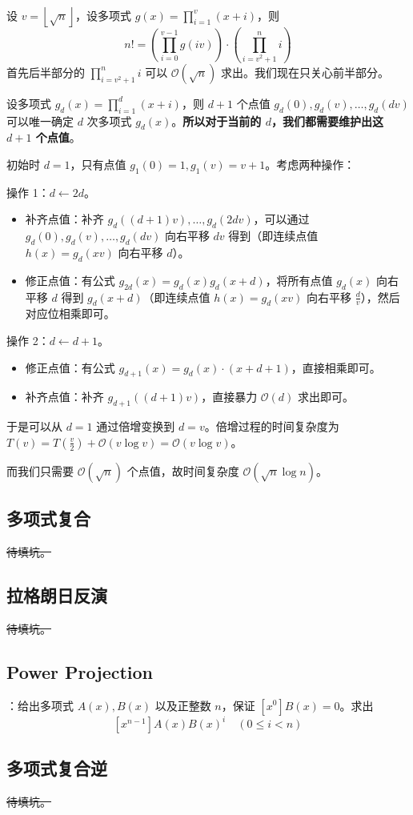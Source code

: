 设 $v = \left\lfloor \sqrt{n} \right\rfloor$，设多项式 $g(x) = \prod_{i = 1}^v (x + i)$，则
\[
n! = \left( \prod_{i = 0}^{v - 1}g(iv) \right) \cdot \left( \prod_{i = v^2 + 1}^n i \right)
\]
首先后半部分的 $\prod_{i = v^2 + 1}^n i$ 可以 $\mathcal{O}(\sqrt{n})$ 求出。我们现在只关心前半部分。

设多项式 $g_d(x) = \prod_{i = 1}^d (x + i)$，则 $d + 1$ 个点值 $g_d(0), g_d(v), \dots, g_d(dv)$ 可以唯一确定 $d$ 次多项式 $g_d(x)$。\textbf{所以对于当前的 $d$，我们都需要维护出这 $d + 1$ 个点值}。

初始时 $d = 1$，只有点值 $g_1(0) = 1, g_1(v) = v + 1$。考虑两种操作：

操作 1：$d \gets 2d$。

\begin{itemize}
    \item 补齐点值：补齐 $g_d((d + 1)v), \dots, g_d(2dv)$，可以通过 $g_d(0), g_d(v), \dots, g_d(dv)$ 向右平移 $dv$ 得到（即连续点值 $h(x) = g_d(xv)$ 向右平移 $d$）。
    \item 修正点值：有公式 $g_{2d}(x) = g_d(x)g_d(x + d)$，将所有点值 $g_d(x)$ 向右平移 $d$ 得到 $g_d(x + d)$（即连续点值 $h(x) = g_d(xv)$ 向右平移 $\frac{d}{v}$），然后对应位相乘即可。
\end{itemize}

操作 2：$d \gets d + 1$。

\begin{itemize}
    \item 修正点值：有公式 $g_{d + 1}(x) = g_d(x) \cdot (x + d + 1)$，直接相乘即可。
    \item 补齐点值：补齐 $g_{d + 1}((d + 1)v)$，直接暴力 $\mathcal{O}(d)$ 求出即可。
\end{itemize}

于是可以从 $d = 1$ 通过倍增变换到 $d = v$。倍增过程的时间复杂度为 $T(v) = T(\frac{v}{2}) + \mathcal{O}(v \log v) = \mathcal{O}(v \log v)$。

而我们只需要 $\mathcal{O}(\sqrt{n})$ 个点值，故时间复杂度 $\mathcal{O}(\sqrt{n} \log n)$。


\subsection{多项式复合}

\sout{待填坑。}

\subsection{拉格朗日反演}

\sout{待填坑。}

\subsection{Power Projection}

：给出多项式 $A(x), B(x)$ 以及正整数 $n$，保证 $[x^0]B(x) = 0$。求出
\[
[x^{n - 1}]A(x)B(x)^i \quad (0 \leq i < n)
\]


\subsection{多项式复合逆}

\sout{待填坑。}